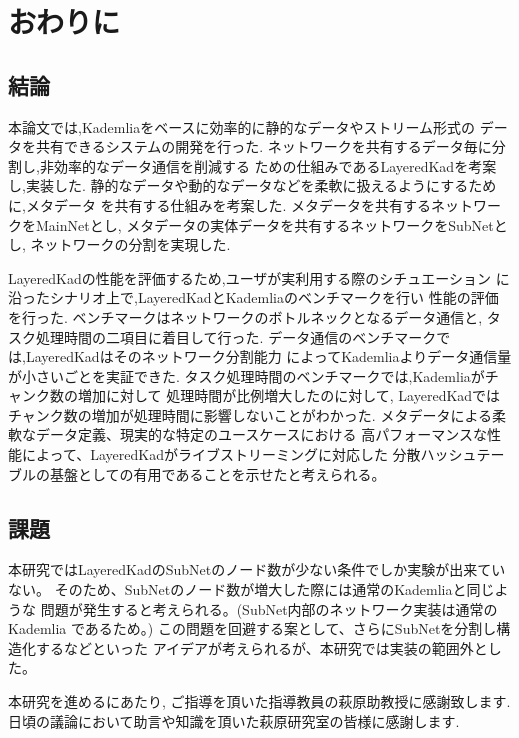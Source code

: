 \documentclass[sotsuron]{jcsie}
\begin{document}

\chapter{おわりに}
\section{結論}
本論文では,Kademliaをベースに効率的に静的なデータやストリーム形式の
データを共有できるシステムの開発を行った.
ネットワークを共有するデータ毎に分割し,非効率的なデータ通信を削減する
ための仕組みであるLayeredKadを考案し,実装した.
静的なデータや動的なデータなどを柔軟に扱えるようにするために,メタデータ
を共有する仕組みを考案した.
メタデータを共有するネットワークをMainNetとし,
メタデータの実体データを共有するネットワークをSubNetとし,
ネットワークの分割を実現した.

LayeredKadの性能を評価するため,ユーザが実利用する際のシチュエーション
に沿ったシナリオ上で,LayeredKadとKademliaのベンチマークを行い
性能の評価を行った.
ベンチマークはネットワークのボトルネックとなるデータ通信と,
タスク処理時間の二項目に着目して行った.
データ通信のベンチマークでは,LayeredKadはそのネットワーク分割能力
によってKademliaよりデータ通信量が小さいごとを実証できた.
タスク処理時間のベンチマークでは,Kademliaがチャンク数の増加に対して
処理時間が比例増大したのに対して,
LayeredKadではチャンク数の増加が処理時間に影響しないことがわかった.
メタデータによる柔軟なデータ定義、現実的な特定のユースケースにおける
高パフォーマンスな性能によって、LayeredKadがライブストリーミングに対応した
分散ハッシュテーブルの基盤としての有用であることを示せたと考えられる。

\section{課題}
本研究ではLayeredKadのSubNetのノード数が少ない条件でしか実験が出来ていない。
そのため、SubNetのノード数が増大した際には通常のKademliaと同じような
問題が発生すると考えられる。(SubNet内部のネットワーク実装は通常のKademlia
であるため。)
この問題を回避する案として、さらにSubNetを分割し構造化するなどといった
アイデアが考えられるが、本研究では実装の範囲外とした。

\begin{acknowledgment}
	本研究を進めるにあたり, ご指導を頂いた指導教員の萩原助教授に感謝致します.
	日頃の議論において助言や知識を頂いた萩原研究室の皆様に感謝します.
\end{acknowledgment}



\end{document}

